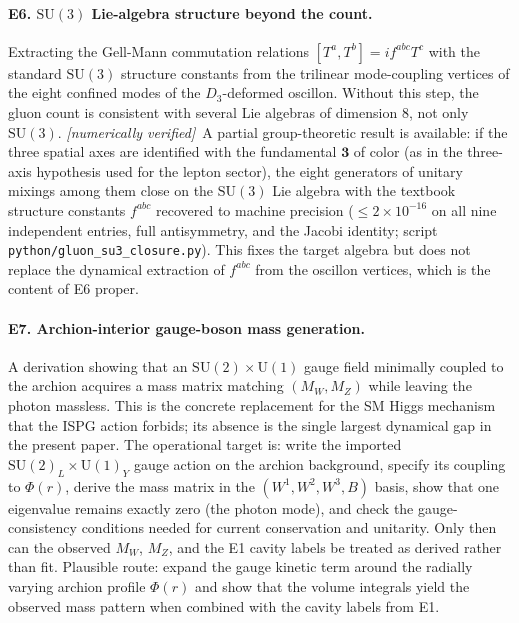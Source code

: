 \documentclass[11pt]{article}
\newcommand{\numerical}{\textit{[numerically verified]}}
\begin{document}
\paragraph{E6. $\mathrm{SU}(3)$ Lie-algebra structure beyond
the count.} Extracting the Gell-Mann commutation relations
$[T^a,T^b]=if^{abc}T^c$ with the standard $\mathrm{SU}(3)$
structure constants from the trilinear mode-coupling vertices
of the eight confined modes of the $D_3$-deformed oscillon.
Without this step, the gluon count is consistent with several
Lie algebras of dimension $8$, not only $\mathrm{SU}(3)$.
\numerical\ A partial group-theoretic result is available: if
the three spatial axes are identified with the fundamental
$\mathbf{3}$ of color (as in the three-axis hypothesis used for
the lepton sector), the eight generators of unitary mixings
among them close on the $\mathrm{SU}(3)$ Lie algebra with the
textbook structure constants $f^{abc}$ recovered to machine
precision ($\leq 2\times 10^{-16}$ on all nine independent
entries, full antisymmetry, and the Jacobi identity;
script \texttt{python/gluon\_su3\_closure.py}). This fixes
the target algebra but does not replace the dynamical
extraction of $f^{abc}$ from the oscillon vertices, which is
the content of E6 proper.

\paragraph{E7. Archion-interior gauge-boson mass generation.}
A derivation showing that an $\mathrm{SU}(2)\times\mathrm{U}(1)$
gauge field minimally coupled to the archion acquires a mass
matrix matching $(M_W,M_Z)$ while leaving the photon massless.
This is the concrete replacement for the SM Higgs mechanism
that the ISPG action forbids; its absence is the single largest
dynamical gap in the present paper. The operational target is:
write the imported $\mathrm{SU}(2)_L\times\mathrm{U}(1)_Y$ gauge
action on the archion background, specify its coupling to
$\Phi(r)$, derive the mass matrix in the $(W^1,W^2,W^3,B)$ basis,
show that one eigenvalue remains exactly zero (the photon mode),
and check the gauge-consistency conditions needed for current
conservation and unitarity. Only then can the observed $M_W$,
$M_Z$, and the E1 cavity labels be treated as derived rather than
fit. Plausible route: expand the gauge kinetic term around the
radially varying archion profile $\Phi(r)$ and show that the
volume integrals yield the observed mass pattern when combined
with the cavity labels from E1.
\end{document}
